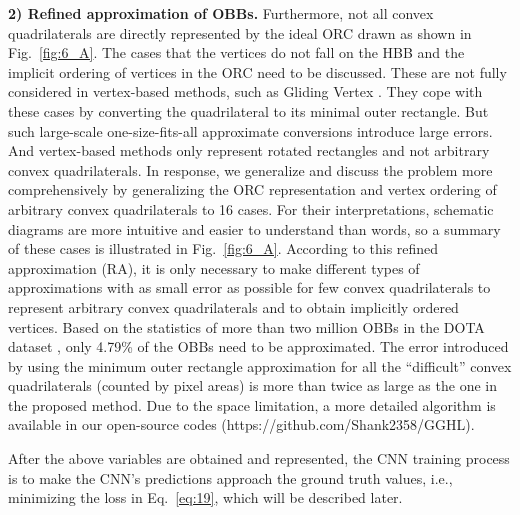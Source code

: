 \textbf{2) Refined approximation of OBBs.} Furthermore, not all convex quadrilaterals are directly represented by the ideal ORC drawn as shown in Fig.~\ref{fig:6_A}. The cases that the vertices do not fall on the HBB and the implicit ordering of vertices in the ORC need to be discussed. These are not fully considered in vertex-based methods, such as Gliding Vertex \cite{xu2020gliding}. They cope with these cases by converting the quadrilateral to its minimal outer rectangle. But such large-scale one-size-fits-all approximate conversions introduce large errors. And vertex-based methods only represent rotated rectangles and not arbitrary convex quadrilaterals. In response, we generalize and discuss the problem more comprehensively by generalizing the ORC representation and vertex ordering of arbitrary convex quadrilaterals to 16 cases. For their interpretations, schematic diagrams are more intuitive and easier to understand than words, so a summary of these cases is illustrated in Fig.~\ref{fig:6_A}. According to this refined approximation (RA), it is only necessary to make different types of approximations with as small error as possible for few convex quadrilaterals to represent arbitrary convex quadrilaterals and to obtain implicitly ordered vertices. Based on the statistics of more than two million OBBs in the DOTA dataset \cite{xiaDOTALargeScaleDataset2018}, only 4.79\% of the OBBs need to be approximated. The error introduced by using the minimum outer rectangle approximation for all the “difficult” convex quadrilaterals (counted by pixel areas) is more than twice as large as the one in the proposed method. Due to the space limitation, a more detailed algorithm is available in our open-source codes (https://github.com/Shank2358/GGHL). 

After the above variables are obtained and represented, the CNN training process is to make the CNN’s predictions approach the ground truth values, i.e., minimizing the loss in Eq.~\ref{eq:19}, which will be described later.

